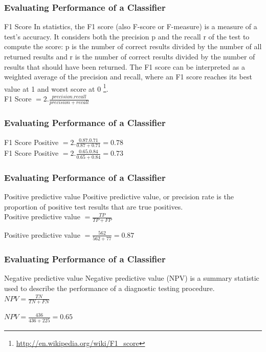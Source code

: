 \documentclass[serif,11pt,aspectratio=1610,table]{beamer}
\begin{document}
\begin{frame}
\frametitle{Evaluating Performance of a Classifier}
 \begin{block}{F1 Score}
  In statistics, the F1 score (also F-score or F-measure) is a measure of a test's accuracy. It considers both the precision p and the recall r of the test to compute the score: p is the number of correct results divided by the number of all returned results and r is the number of correct results divided by the number of results that should have been returned. The F1 score can be interpreted as a weighted average of the precision and recall, where an F1 score reaches its best value at 1 and worst score at 0 \footnote{\url{http://en.wikipedia.org/wiki/F1\_score}}.\\
\vspace{.5cm}
F1 Score $ = 2 . \frac{precision . recall}{precision + recall}$
 \end{block}

\end{frame}

\begin{frame}
 \frametitle{Evaluating Performance of a Classifier}
F1 Score Positive  $= 2 . \frac{0.87 . 0.71}{0.87 + 0.71} = 0.78$ \\
F1 Score Positive $= 2 . \frac{0.65 . 0.84}{0.65 + 0.84} = 0.73$
\end{frame}

\begin{frame}
\frametitle{Evaluating Performance of a Classifier}
 \begin{block}{Positive predictive value}
  Positive predictive value, or precision rate is the proportion of positive test results that are true positives.\\
\vspace{.5cm}
 Positive predictive value $= \frac{TP}{TP+FP} $
 \end{block}
\vspace{.5cm}
Positive predictive value $= \frac{562}{562+77} = 0.87$
\end{frame}

\begin{frame}
\frametitle{Evaluating Performance of a Classifier}
 \begin{block}{Negative predictive value}
  Negative predictive value (NPV) is a summary statistic used to describe the performance of a diagnostic testing procedure.\\
\vspace{.5cm}
$NPV = \frac{TN}{TN+FN}$
 \end{block}
\vspace{.5cm}
$NPV = \frac{436}{436+225} = 0.65$
\end{frame}
\end{document}
